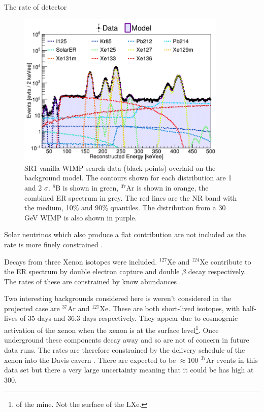 The rate of detector 
\begin{figure}
    \centering
    \includegraphics[width=10cm]{Figures/EFT/All_SR1_Plots/ER_band_fit.png}
    \caption{SR1 vanilla WIMP-search data (black points) overlaid on the background model.
    The contours shown for each distribution are 1 and 2 $\sigma$.
    ${}^{8}$B is shown in green, ${}^{37}$Ar is shown in orange, the combined ER spectrum in grey.
    The red lines are the NR band with the medium, 10\% and 90\% quantiles.
    The distribution from a 30 GeV WIMP is also shown in purple. 
    }
    \label{fig:sr1_spectra}
\end{figure}


\par
Solar neutrinos which also produce a flat contribution are not included as the rate is more finely constrained \cite{pp_solar_neutrinos_rate_ref}.
\par
Decays from three Xenon isotopes were included.
${}^{127}$Xe and ${}^{124}$Xe contribute to the ER spectrum by double electron capture and double $\beta$ decay respectively.
The rates of these are constrained by know abundances \cite{xenon_isotopes_ref}.
\par
Two interesting backgrounds considered here is weren't considered in the projected case are ${}^{37}$Ar and ${}^{127}$Xe.
These are both short-lived isotopes, with half-lives of 35 days and 36.3 days respectively.
They appear due to cosmogenic activation of the xenon when the xenon is at the surface level\footnote{of the mine. Not the surface of the LXe.}.
Once underground these components decay away and so are not of concern in future data runs.
The rates are therefore constrained by the delivery schedule of the xenon into the Davis cavern \cite{lz_argon37_ref}.
There are expected to be $\approx$100 ${}^{37}$Ar events in this data set but there a very large uncertainty meaning that it could be has high at 300.


